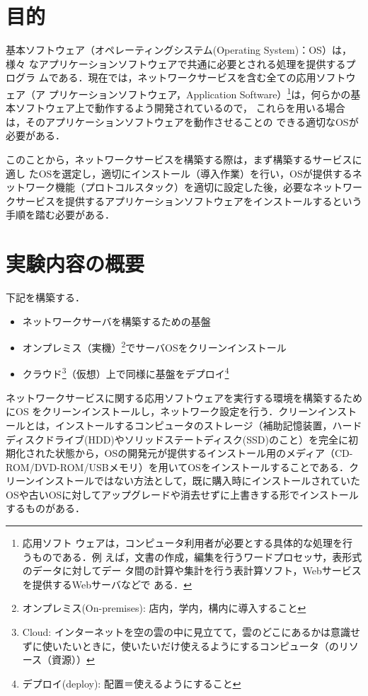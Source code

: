 
\section{目的}

基本ソフトウェア（オペレーティングシステム(Operating System)：OS）は，様々
なアプリケーションソフトウェアで共通に必要とされる処理を提供するプログラ
ムである．現在では，ネットワークサービスを含む全ての応用ソフトウェア（ア
プリケーションソフトウェア，Application Software）\footnote{ 応用ソフト
ウェアは，コンピュータ利用者が必要とする具体的な処理を行うものである．例
えば，文書の作成，編集を行うワードプロセッサ，表形式のデータに対してデー
タ間の計算や集計を行う表計算ソフト，Webサービスを提供するWebサーバなどで
ある．}は，何らかの基本ソフトウェア上で動作するよう開発されているので，
これらを用いる場合は，そのアプリケーションソフトウェアを動作させることの
できる適切なOSが必要がある．

このことから，ネットワークサービスを構築する際は，まず構築するサービスに適し
たOSを選定し，適切にインストール（導入作業）を行い，OSが提供するネットワーク機能（プロトコルスタック）を適切に設定した後，必要なネットワークサービスを提供するアプリケーションソフトウェアをインストールするという手順を踏む必要がある．

\section{実験内容の概要}

下記を構築する．
\begin{itemize}
    \item ネットワークサーバを構築するための基盤
    \item オンプレミス（実機）\footnote{オンプレミス(On-premises): 店内，学内，構内に導入すること}でサーバOSをクリーンインストール
    \item クラウド\footnote{Cloud: インターネットを空の雲の中に見立てて，雲のどこにあるかは意識せずに使いたいときに，使いたいだけ使えるようにするコンピュータ（のリソース（資源））}（仮想）上で同様に基盤をデプロイ\footnote{デプロイ(deploy): 配置＝使えるようにすること}
\end{itemize}

ネットワークサービスに関する応用ソフトウェアを実行する環境を構築するため
にOS をクリーンインストールし，ネットワーク設定を行う．クリーンインストールとは，インストールするコンピュータのストレージ（補助記憶装置，ハードディスクドライブ(HDD)やソリッドステートディスク(SSD)のこと）を完全に初期化された状態から，OSの開発元が提供するインストール用のメディア（CD-ROM/DVD-ROM/USBメモリ）を用いてOSをインストールすることである．クリーンインストールではない方法として，既に購入時にインストールされていたOSや古いOSに対してアップグレードや消去せずに上書きする形でインストールするものがある．

